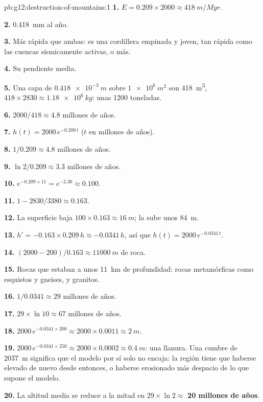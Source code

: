 \begin{solution}{pb:g12:destruction-of-mountains:1}
\textbf{1.} $E = 0.209 \times 2000 \approx \qty{418}{m/Myr}$.

\textbf{2.} \qty{0.418}{mm} al año.

\textbf{3.} Más rápida que ambas: es una cordillera empinada y joven, tan
rápida como las cuencas sísmicamente activas, o más.

\textbf{4.} Su pendiente media.

\textbf{5.} Una capa de $\qty{0.418e-3}{m}$ sobre $\qty{1e6}{m^2}$ son
\qty{418}{m^3}, $418 \times 2830 \approx \qty{1.18e6}{kg}$: unas 1200
toneladas.

\textbf{6.} $2000/418 \approx 4.8$ millones de años.

\textbf{7.} $h(t) = 2000\,e^{-0.209\,t}$ ($t$ en millones de años).

\textbf{8.} $1/0.209 \approx 4.8$ millones de años.

\textbf{9.} $\ln 2/0.209 \approx 3.3$ millones de años.

\textbf{10.} $e^{-0.209 \times 11} = e^{-2.30} \approx 0.100$.

\textbf{11.} $1 - 2830/3380 \approx 0.163$.

\textbf{12.} La superficie baja $100 \times 0.163 \approx \qty{16}{m}$; la
 sube unos \qty{84}{m}.

\textbf{13.} $h' = -0.163 \times 0.209\,h \approx -0.0341\,h$, así que $h(t) =
2000\,e^{-0.0341\,t}$.

\textbf{14.} $(2000 - 200)/0.163 \approx \qty{11000}{m}$ de roca.

\textbf{15.} Rocas que estaban a unos \qty{11}{km} de profundidad: rocas
metamórficas como esquistos y gneises, y granitos.

\textbf{16.} $1/0.0341 \approx 29$ millones de años.

\textbf{17.} $29 \times \ln 10 \approx 67$ millones de años.

\textbf{18.} $2000\,e^{-0.0341 \times 200} \approx 2000 \times 0.0011 \approx
\qty{2}{m}$.

\textbf{19.} $2000\,e^{-0.0341 \times 250} \approx 2000 \times 0.0002 \approx
\qty{0.4}{m}$: una llanura. Una cumbre de \qty{2037}{m} significa que el
modelo por sí solo no encaja: la región tiene que haberse elevado de nuevo
desde entonces, o haberse erosionado más despacio de lo que supone el modelo.

\textbf{20.} La altitud media se reduce a la mitad en $29 \times \ln 2 \approx$
\textbf{20 millones de años}.
\end{solution}
